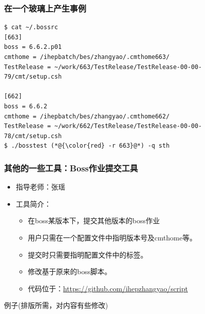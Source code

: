 \begin{frame}
    \frametitle{在一个玻璃上产生事例}
\end{frame}


\newsavebox{\ZhangYaoBossScript}
\begin{lrbox}{\ZhangYaoBossScript}
\begin{lstlisting}
$ cat ~/.bossrc 
[663]
boss = 6.6.2.p01
cmthome = /ihepbatch/bes/zhangyao/.cmthome663/
TestRelease = ~/work/663/TestRelease/TestRelease-00-00-79/cmt/setup.csh

[662]
boss = 6.6.2
cmthome = /ihepbatch/bes/zhangyao/.cmthome662/
TestRelease = ~/work/662/TestRelease/TestRelease-00-00-78/cmt/setup.csh
$ ./bosstest (*@{\color{red} -r 663}@*) -q sth
\end{lstlisting}
\end{lrbox}

\begin{frame}
    \frametitle{其他的一些工具：Boss作业提交工具}
    \begin{itemize}
        \item 指导老师：张瑶
        \item 工具简介：
            \begin{itemize}
                \item 在boss某版本下，提交其他版本的boss作业
                \item 用户只需在一个配置文件中指明版本号及cmthome等。
                \item 提交时只需要指明配置文件中的标签。
                \item 修改基于原来的boss脚本。
                \item 代码位于：\url{https://github.com/ihepzhangyao/script}
            \end{itemize}
    \end{itemize}
    \begin{block}{例子(排版所需，对内容有些修改)}
        \par\usebox{\ZhangYaoBossScript}
    \end{block}
\end{frame}

